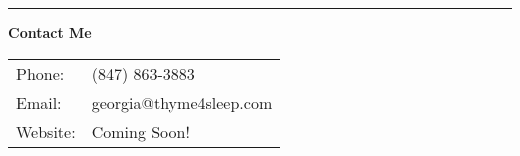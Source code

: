 \documentclass{article}
\begin{document}
\vspace{0.5em} %
\hrule %

\begin{center}
    \vspace{0.3em} %
    {\normalsize \textbf{Contact Me}} \\
    \vspace{0.1cm} %
    \begin{tabular}{@{}ll@{}} %
        Phone: & (847) 863-3883 \\
        Email: & georgia@thyme4sleep.com \\
        Website: & Coming Soon! \\
    \end{tabular}
    \vspace{0.3em} %
\end{center}
\end{document}
